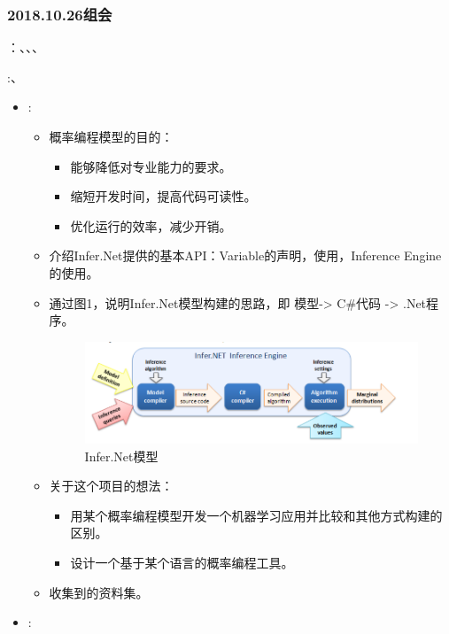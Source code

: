 \subsubsection{2018.10.26组会}
\label{sec:g2018:1026}
：\RenZH、\TangLT、\ZY、\ZhangYX

:\RenZH、\ZY

\begin{itemize}
\item \RenZH:
    \begin{itemize}
        \item 概率编程模型的目的：
            \begin{itemize}
                \item 能够降低对专业能力的要求。
                \item 缩短开发时间，提高代码可读性。
                \item 优化运行的效率，减少开销。
            \end{itemize}
        \item 介绍Infer.Net提供的基本API：Variable的声明，使用，Inference Engine的使用。
        \item 通过图1，说明Infer.Net模型构建的思路，即 模型-> C\#代码 -> .Net程序。
            \begin{figure}[h]
                \includegraphics[width=\linewidth]{pic/how_work}
                \caption{Infer.Net模型}
            \end{figure}
        \item 关于这个项目的想法：
            \begin{itemize}
                \item 用某个概率编程模型开发一个机器学习应用并比较和其他方式构建的区别。
                \item 设计一个基于某个语言的概率编程工具。
            \end{itemize}
        \item 收集到的资料集。
    \end{itemize}
\item \TangLT:
    \begin{itemize}

\end{itemize}
\end{itemize}
